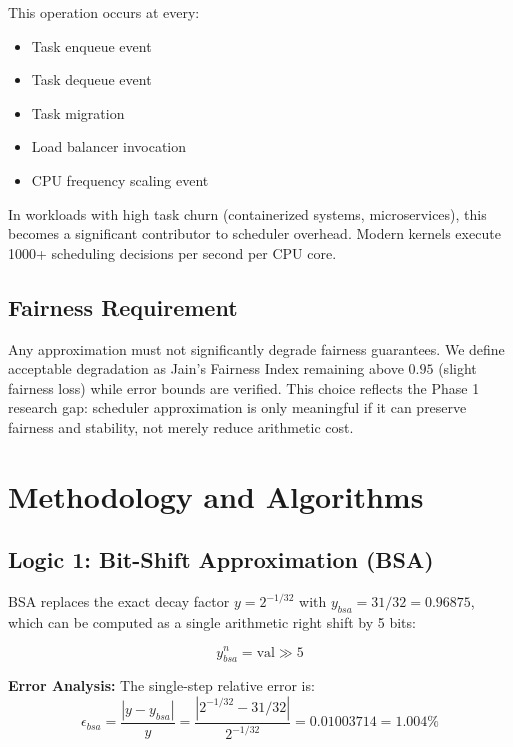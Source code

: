 \documentclass[conference]{IEEEtran}
\begin{document}
This operation occurs at every:
\begin{itemize}
\item Task enqueue event
\item Task dequeue event  
\item Task migration
\item Load balancer invocation
\item CPU frequency scaling event
\end{itemize}

In workloads with high task churn (containerized systems, microservices), this becomes a significant contributor to scheduler overhead. Modern kernels execute 1000+ scheduling decisions per second per CPU core.

\subsection{Fairness Requirement}

Any approximation must not significantly degrade fairness guarantees. We define acceptable degradation as Jain's Fairness Index remaining above $0.95$ (slight fairness loss) while error bounds are verified. This choice reflects the Phase 1 research gap: scheduler approximation is only meaningful if it can preserve fairness and stability, not merely reduce arithmetic cost.

\section{Methodology and Algorithms}\label{sec:methodology}

\subsection{Logic 1: Bit-Shift Approximation (BSA)}

BSA replaces the exact decay factor $y = 2^{-1/32}$ with $y_{bsa} = 31/32 = 0.96875$, which can be computed as a single arithmetic right shift by 5 bits:

\begin{equation}
y^n_{bsa} = \text{val} \gg 5
\label{eq:bsa}
\end{equation}

\textbf{Error Analysis:}
The single-step relative error is:
\begin{equation}
\epsilon_{bsa} = \frac{|y - y_{bsa}|}{y} = \frac{|2^{-1/32} - 31/32|}{2^{-1/32}} = 0.01003714 = 1.004\%
\label{eq:bsa_error}
\end{equation}
\end{document}
